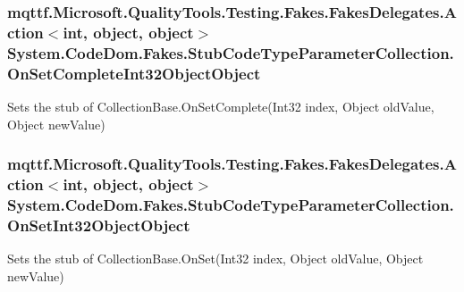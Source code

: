 \hypertarget{class_system_1_1_code_dom_1_1_fakes_1_1_stub_code_type_parameter_collection_ac1fd20ffb3900e47d0157c0c9a726150}{
\subsubsection[{On\-Set\-Complete\-Int32\-Object\-Object}]{\setlength{\rightskip}{0pt plus 5cm}mqttf.\-Microsoft.\-Quality\-Tools.\-Testing.\-Fakes.\-Fakes\-Delegates.\-Action$<$int, object, object$>$ System.\-Code\-Dom.\-Fakes.\-Stub\-Code\-Type\-Parameter\-Collection.\-On\-Set\-Complete\-Int32\-Object\-Object}}\label{class_system_1_1_code_dom_1_1_fakes_1_1_stub_code_type_parameter_collection_ac1fd20ffb3900e47d0157c0c9a726150}


Sets the stub of Collection\-Base.\-On\-Set\-Complete(\-Int32 index, Object old\-Value, Object new\-Value)

\hypertarget{class_system_1_1_code_dom_1_1_fakes_1_1_stub_code_type_parameter_collection_aa836627e2dd011515b43d1fff47b340c}{
\subsubsection[{On\-Set\-Int32\-Object\-Object}]{\setlength{\rightskip}{0pt plus 5cm}mqttf.\-Microsoft.\-Quality\-Tools.\-Testing.\-Fakes.\-Fakes\-Delegates.\-Action$<$int, object, object$>$ System.\-Code\-Dom.\-Fakes.\-Stub\-Code\-Type\-Parameter\-Collection.\-On\-Set\-Int32\-Object\-Object}}\label{class_system_1_1_code_dom_1_1_fakes_1_1_stub_code_type_parameter_collection_aa836627e2dd011515b43d1fff47b340c}


Sets the stub of Collection\-Base.\-On\-Set(\-Int32 index, Object old\-Value, Object new\-Value)

